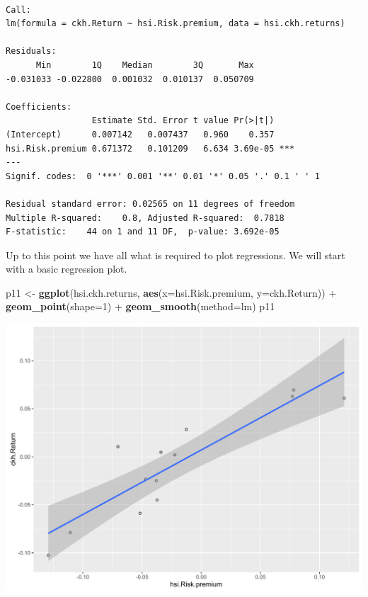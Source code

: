 \documentclass[]{article}
\newenvironment{Shaded}{\begin{snugshade}}{\end{snugshade}}
\newcommand{\KeywordTok}[1]{\textcolor[rgb]{0.13,0.29,0.53}{\textbf{{#1}}}}
\newcommand{\DataTypeTok}[1]{\textcolor[rgb]{0.13,0.29,0.53}{{#1}}}
\newcommand{\DecValTok}[1]{\textcolor[rgb]{0.00,0.00,0.81}{{#1}}}
\newcommand{\StringTok}[1]{\textcolor[rgb]{0.31,0.60,0.02}{{#1}}}
\newcommand{\NormalTok}[1]{{#1}}
\begin{document}
\begin{verbatim}

Call:
lm(formula = ckh.Return ~ hsi.Risk.premium, data = hsi.ckh.returns)

Residuals:
      Min        1Q    Median        3Q       Max 
-0.031033 -0.022800  0.001032  0.010137  0.050709 

Coefficients:
                 Estimate Std. Error t value Pr(>|t|)    
(Intercept)      0.007142   0.007437   0.960    0.357    
hsi.Risk.premium 0.671372   0.101209   6.634 3.69e-05 ***
---
Signif. codes:  0 '***' 0.001 '**' 0.01 '*' 0.05 '.' 0.1 ' ' 1

Residual standard error: 0.02565 on 11 degrees of freedom
Multiple R-squared:    0.8, Adjusted R-squared:  0.7818 
F-statistic:    44 on 1 and 11 DF,  p-value: 3.692e-05
\end{verbatim}

Up to this point we have all what is required to plot regressions. We
will start with a basic regression plot.

\begin{Shaded}
\begin{Highlighting}[]
\NormalTok{p11 <-}\StringTok{ }\KeywordTok{ggplot}\NormalTok{(hsi.ckh.returns, }\KeywordTok{aes}\NormalTok{(}\DataTypeTok{x=}\NormalTok{hsi.Risk.premium, }\DataTypeTok{y=}\NormalTok{ckh.Return)) +}\StringTok{ }\KeywordTok{geom_point}\NormalTok{(}\DataTypeTok{shape=}\DecValTok{1}\NormalTok{) +}\StringTok{ }\KeywordTok{geom_smooth}\NormalTok{(}\DataTypeTok{method=}\NormalTok{lm) }
\NormalTok{p11}
\end{Highlighting}
\end{Shaded}

\begin{center}\includegraphics{0_all_posts_pdf/lr_6-1} \end{center}
\end{document}
